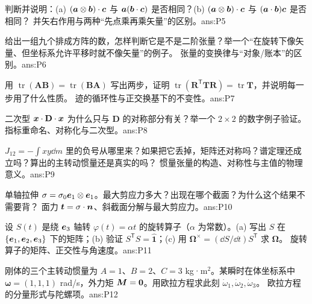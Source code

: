 \documentclass[11pt]{ctexart}
\newcommand{\ten}[1]{\mathbf{#1}}
\newcommand{\unitd}{\hat{\ten{1}}}
\newcommand{\tr}{\operatorname{tr}}
\let\orighdr\hdr
\renewcommand{\hdr}[2]{\par\needspace{5\baselineskip}\orighdr{#1}{#2}}
\begin{document}
{判断并说明：(a) $(\boldsymbol{a}\otimes\boldsymbol{b})\cdot\boldsymbol{c}$ 与 $\boldsymbol{a}(\boldsymbol{b}\cdot\boldsymbol{c})$ 是否相同？(b) $(\boldsymbol{a}\otimes\boldsymbol{b})\cdot\boldsymbol{c}$ 与 $(\boldsymbol{a}\cdot\boldsymbol{b})\boldsymbol{c}$ 是否相同？}
{并矢右作用与两种“先点乘再乘矢量”的区别。}{ans:P5}

{给出一组九个排成方阵的数，怎样判断它是不是二阶张量？举一个“在旋转下像矢量、但坐标系允许平移时就不像矢量”的例子。}
{张量的变换律与“对象/账本”的区别。}{ans:P6}

{用 $\tr(\ten A\ten B)=\tr(\ten B\ten A)$ 写出两步，证明 $\tr(\ten R^{\mathsf T}\ten T\ten R)=\tr\ten T$，并说明每一步用了什么性质。}
{迹的循环性与正交换基下的不变性。}{ans:P7}

{二次型 $\vect x\cdot\ten D\cdot\vect x$ 为什么只与 $\ten D$ 的对称部分有关？举一个 $2\times2$ 的数字例子验证。}
{指标重命名、对称化与二次型。}{ans:P8}

{$J_{12}=-\int xy\dd m$ 里的负号从哪里来？如果把它丢掉，矩阵还对称吗？谱定理还成立吗？算出的主转动惯量还是真实的吗？}
{惯量张量的构造、对称性与主值的物理意义。}{ans:P9}

{单轴拉伸 $\ten\sigma=\sigma_0\vect e_1\otimes\vect e_1$。最大剪应力多大？出现在哪个截面？为什么这个结果不需要背？}
{面力 $\vect t=\ten\sigma\cdot\vect n$、斜截面分解与最大剪应力。}{ans:P10}

{设 $S(t)$ 是绕 $\boldsymbol{e}_3$ 轴转 $\varphi(t)=\alpha t$ 的旋转算子（$\alpha$ 为常数）。(a) 写出 $S$ 在 $\{\boldsymbol{e}_1,\boldsymbol{e}_2,\boldsymbol{e}_3\}$ 下的矩阵；(b) 验证 $S^{\mathsf T}S=\unitd$；(c) 用 $\boldsymbol\Omega^{\times}=(\dd S/\dd t)S^{\mathsf T}$ 求 $\boldsymbol\Omega$。}
{旋转算子的矩阵、正交性与角速度。}{ans:P11}

{刚体的三个主转动惯量为 $A=1$、$B=2$、$C=3$ kg·m$^2$。某瞬时在体坐标系中 $\boldsymbol\omega=(1,1,1)$ rad/s，外力矩 $\boldsymbol{M}=\boldsymbol{0}$。用欧拉方程求此刻 $\dot\omega_1,\dot\omega_2,\dot\omega_3$。}
{欧拉方程的分量形式与陀螺项。}{ans:P12}

\end{document}

